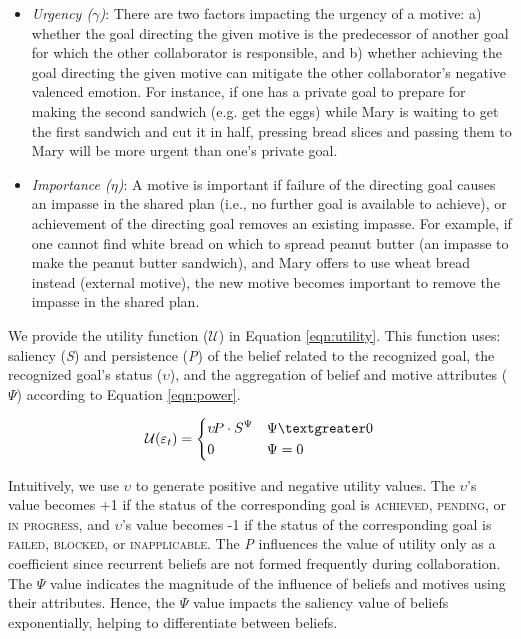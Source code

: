 \documentclass{sig-alternate-05-2015}
\begin{document}
\begin{itemize}[leftmargin=2pt]
  \setlength\itemsep{0.05mm}
  \item \textit{Urgency ($\gamma$)}: There are two factors impacting the urgency
  of a motive: a) whether the goal directing the given motive is the predecessor of
  another goal for which the other collaborator is responsible, and b) whether
  achieving the goal directing the given motive can mitigate the other
  collaborator's negative valenced emotion. For instance, if one has a private
  goal to prepare for making the second sandwich (e.g. get the eggs) while Mary
  is waiting to get the first sandwich and cut it in half, pressing bread slices
  and passing them to Mary will be more urgent than one's private goal.
  \item \textit{Importance ($\eta$)}: A motive is important if failure of the
  directing goal causes an impasse in the shared plan (i.e., no further goal is
  available to achieve), or achievement of the directing goal removes an
  existing impasse. For example, if one cannot find white bread on which to
  spread peanut butter (an impasse to make the peanut butter sandwich), and Mary
  offers to use wheat bread instead (external motive), the new motive becomes
  important to remove the impasse in the shared plan.
\end{itemize}

We provide the utility function ($\mathcal{U}$) in Equation \ref{eqn:utility}.
This function uses: saliency (\textit{S}) and persistence (\textit{P}) of the
belief related to the recognized goal, the recognized goal's status
($\upsilon$), and the aggregation of belief and motive attributes ($\Psi$)
according to Equation \ref{eqn:power}.

\begin{equation}
    \mathcal{U}(\varepsilon_t)= 
    \begin{dcases}
       \upsilon\!P\cdot S^{\Psi} & \Psi \textgreater 0 \\
       0               			 & \Psi = 0
    \end{dcases}
    \label{eqn:utility}
\end{equation}

Intuitively, we use $\upsilon$ to generate positive and negative utility values.
The $\upsilon$'s value becomes +1 if the status of the corresponding goal is
\textsc{achieved}, \textsc{pending}, or \textsc{in progress}, and $\upsilon$'s
value becomes -1 if the status of the corresponding goal is \textsc{failed,
blocked}, or \textsc{inapplicable}. The \textit{P} influences the value of
utility only as a coefficient since recurrent beliefs are not formed frequently
during collaboration. The $\Psi$ value indicates the magnitude of the influence
of beliefs and motives using their attributes. Hence, the $\Psi$ value impacts
the saliency value of beliefs exponentially, helping to differentiate between
beliefs.
\end{document}
